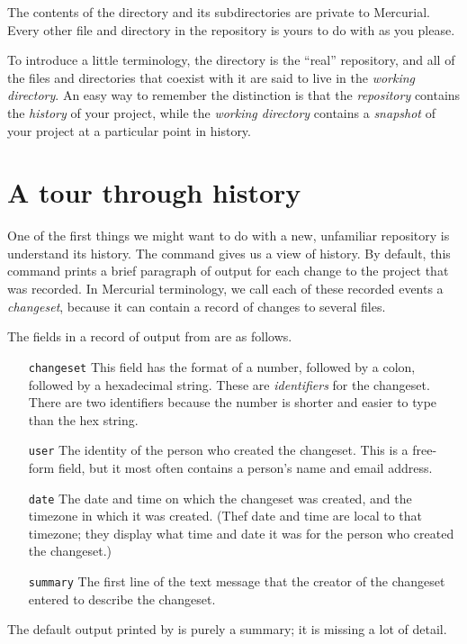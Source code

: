 The contents of the  directory and its subdirectories are
private to Mercurial.  Every other file and directory in the
repository is yours to do with as you please.

To introduce a little terminology, the  directory is the
``real'' repository, and all of the files and directories that coexist
with it are said to live in the \emph{working directory}.  An easy way
to remember the distinction is that the \emph{repository} contains the
\emph{history} of your project, while the \emph{working directory}
contains a \emph{snapshot} of your project at a particular point in
history.

\section{A tour through history}

One of the first things we might want to do with a new, unfamiliar
repository is understand its history.  The  command gives
us a view of history.
By default, this command prints a brief paragraph of output for each
change to the project that was recorded.  In Mercurial terminology, we
call each of these recorded events a \emph{changeset}, because it can
contain a record of changes to several files.

The fields in a record of output from  are as follows.
\begin{itemize}
\item[\texttt{changeset}] This field has the format of a number,
  followed by a colon, followed by a hexadecimal string.  These are
  \emph{identifiers} for the changeset.  There are two identifiers
  because the number is shorter and easier to type than the hex
  string.
\item[\texttt{user}] The identity of the person who created the
  changeset.  This is a free-form field, but it most often contains a
  person's name and email address.
\item[\texttt{date}] The date and time on which the changeset was
  created, and the timezone in which it was created.  (Thef date and
  time are local to that timezone; they display what time and date it
  was for the person who created the changeset.)
\item[\texttt{summary}] The first line of the text message that the
  creator of the changeset entered to describe the changeset.
\end{itemize}
The default output printed by  is purely a summary; it is
missing a lot of detail.

